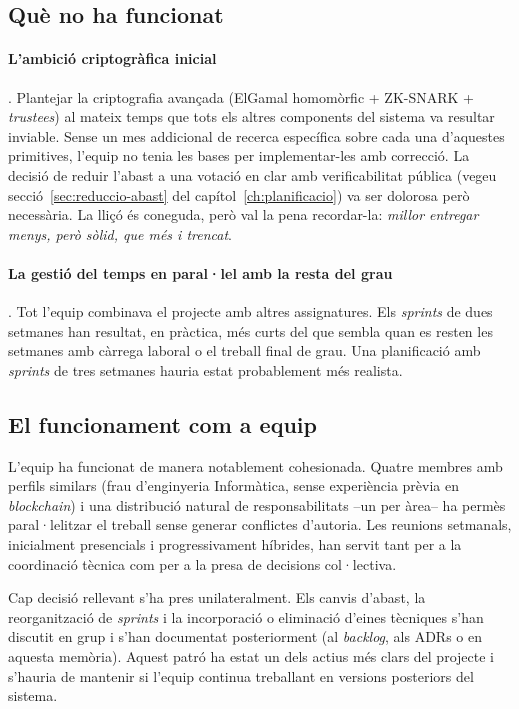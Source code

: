 \subsection{Què no ha funcionat}
\label{subsec:que-no-ha-funcionat}

\paragraph{L'ambició criptogràfica inicial}.
Plantejar la criptografia avançada (ElGamal homomòrfic + \ac{ZK}-SNARK + \textit{trustees}) al mateix temps que tots
els altres components del sistema va resultar inviable.
Sense un mes addicional de recerca específica sobre cada una d'aquestes primitives, l'equip no tenia les bases per
implementar-les amb correcció.
La decisió de reduir l'abast a una votació en clar amb verificabilitat pública (vegeu secció~\ref{sec:reduccio-abast}
del capítol~\ref{ch:planificacio}) va ser dolorosa però necessària.
La lliçó és coneguda, però val la pena recordar-la: \emph{millor entregar menys, però sòlid, que més i trencat}.

\paragraph{La gestió del temps en paral·lel amb la resta del grau}.
Tot l'equip combinava el projecte amb altres assignatures.
Els \emph{sprints} de dues setmanes han resultat, en pràctica, més curts del que sembla quan es resten les setmanes amb
càrrega laboral o el treball final de grau.
Una planificació amb \emph{sprints} de tres setmanes hauria estat probablement més realista.

\subsection{El funcionament com a equip}
\label{subsec:el-funcionament-com-a-equip}

L'equip ha funcionat de manera notablement cohesionada.
Quatre membres amb perfils similars (frau d'enginyeria Informàtica, sense experiència prèvia en \emph{blockchain}) i una
distribució natural de responsabilitats --un per àrea-- ha permès paral·lelitzar el treball sense generar conflictes
d'autoria.
Les reunions setmanals, inicialment presencials i progressivament híbrides, han servit tant per a la coordinació tècnica
com per a la presa de decisions col·lectiva.

Cap decisió rellevant s'ha pres unilateralment.
Els canvis d'abast, la reorganització de \emph{sprints} i la incorporació o eliminació d'eines tècniques s'han discutit
en grup i s'han documentat posteriorment (al \emph{backlog}, als \acp{ADR} o en aquesta memòria).
Aquest patró ha estat un dels actius més clars del projecte i s'hauria de mantenir si l'equip continua treballant en
versions posteriors del sistema.


